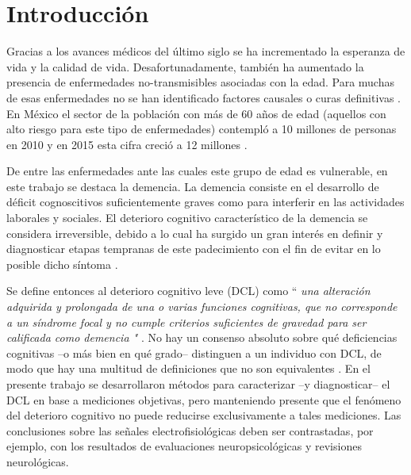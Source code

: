 
\chapter{Introducción}

Gracias a los avances médicos del último siglo se ha incrementado la esperanza de vida y la 
calidad de vida. Desafortunadamente, también ha aumentado la presencia de enfermedades 
no-transmisibles asociadas con la edad. 
%
Para muchas de esas enfermedades no se han identificado factores causales o curas definitivas 
\cite{PlanAlzheimer04}.
%
En México el sector de la población con más de 60 años de edad (aquellos con alto riesgo para este
tipo de enfermedades) contempló a 10 millones de personas en 2010 y en 2015 esta cifra 
creció a 12 millones \cite{Censo10,Intercensal15}.

De entre las enfermedades ante las cuales este grupo de edad es vulnerable, en este trabajo se 
destaca la demencia. 
%
La demencia consiste en el desarrollo de déficit cognoscitivos suficientemente graves como para 
interferir en las actividades laborales y sociales.
%
El deterioro cognitivo característico de la demencia se considera irreversible, debido a lo cual 
ha surgido un gran interés en definir y diagnosticar etapas tempranas de este padecimiento con el 
fin de evitar en lo posible dicho síntoma \cite{Knopman01}.

Se define entonces al deterioro cognitivo leve (DCL) como ``\textit{ una alteración adquirida y 
prolongada de una o varias funciones cognitivas, que no corresponde a un síndrome focal y no cumple 
criterios suficientes de gravedad para ser calificada como demencia "} \cite{Robles02}.
%
No hay un consenso absoluto sobre qué deficiencias cognitivas --o más bien en qué grado-- 
distinguen a un individuo con DCL, de modo que hay una multitud de definiciones que no son
equivalentes \cite{Petersen01}.
%
En el presente trabajo se desarrollaron métodos para caracterizar --y diagnosticar-- el DCL en base 
a mediciones objetivas, pero manteniendo presente que el fenómeno del deterioro cognitivo no puede 
reducirse exclusivamente a tales mediciones. Las conclusiones sobre las señales electrofisiológicas 
deben ser contrastadas, por ejemplo, con los resultados de evaluaciones neuropsicológicas y revisiones neurológicas.

